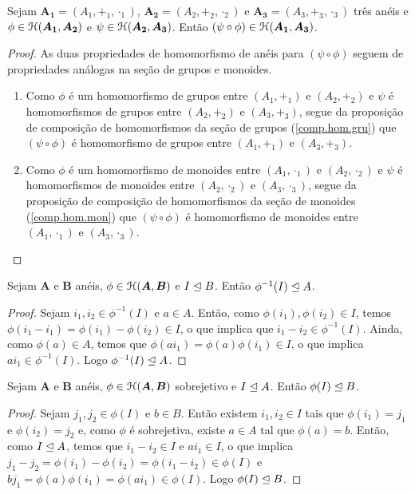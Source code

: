 \begin{corollary}
\label{prop:comp.hom.ane}
	Sejam $\bm{A_1}=(A_1,+_1,\cdot_1)$, $\bm{A_2}=(A_2,+_2,\cdot_2)$ e $\bm{A_3}=(A_3,+_3,\cdot_3)$ três anéis e $\phi \in \mathcal{H}(\bm{A_1},\bm{A_2})$ e $\psi \in \mathcal{H}(\bm{A_2},\bm{A_3})$. Então $(\psi \circ \phi) \in \mathcal{H}(\bm{A_1},\bm{A_3})$.
\end{corollary}
\begin{proof} As duas propriedades de homomorfismo de anéis para $(\psi \circ \phi)$ seguem de propriedades análogas na seção de grupos e monoides.
	\begin{enumerate}
	\item Como $\phi$ é um homomorfismo de grupos entre $(A_1,+_1)$ e $(A_2,+_2)$ e $\psi$ é homomorfismos de grupos entre $(A_2,+_2)$ e $(A_3,+_3)$, segue da proposição de composição de homomorfismos da seção de grupos (\ref{comp.hom.gru}) que $(\psi \circ \phi)$ é homomorfismo de grupos entre $(A_1,+_1)$ e $(A_3,+_3)$.
	\item Como $\phi$ é um homomorfismo de monoides entre $(A_1,\cdot_1)$ e $(A_2,\cdot_2)$ e $\psi$ é homomorfismos de monoides entre $(A_2,\cdot_2)$ e $(A_3,\cdot_3)$, segue da proposição de composição de homomorfismos da seção de monoides (\ref{comp.hom.mon}) que $(\psi \circ \phi)$ é homomorfismo de monoides entre $(A_1,\cdot_1)$ e $(A_3,\cdot_3)$.
	\end{enumerate}
\end{proof}

\begin{proposition}
\label{prop:ide.im.inv}
	Sejam $\bm A$ e $\bm B$ anéis, $\phi \in \mathcal{H}(\bm A,\bm B)$ e $I \mathrel{\unlhd} B$. Então $\phi^{-1}(I) \mathrel{\unlhd} A$.
\end{proposition}
\begin{proof}
	Sejam $i_1,i_2 \in \phi^{-1}(I)$ e $a \in A$. Então, como $\phi(i_1),\phi(i_2) \in I$, temos $\phi(i_1-i_1)=\phi(i_1)-\phi(i_2) \in I$, o que implica que $i_1-i_2 \in \phi^{-1}(I)$. Ainda, como $\phi(a) \in A$, temos que $\phi(ai_1)=\phi(a)\phi(i_1) \in I$, o que implica $ai_1 \in \phi^{-1}(I)$. Logo $\phi^{-1}(I) \mathrel{\unlhd} A$.
\end{proof}

\begin{proposition}
\label{prop:ide.im.ide}
	Sejam $\bm A$ e $\bm B$ anéis, $\phi \in \mathcal{H}(\bm A,\bm B)$ sobrejetivo e $I \mathrel{\unlhd} A$. Então $\phi(I) \mathrel{\unlhd} B$.
\end{proposition}
\begin{proof}
	Sejam $j_1,j_2 \in \phi(I)$ e $b \in B$. Então existem $i_1,i_2 \in I$ tais que $\phi(i_1)=j_1$ e $\phi(i_2)=j_2$ e, como $\phi$ é sobrejetiva, existe $a \in A$ tal que $\phi(a)=b$. Então, como $I \mathrel{\unlhd} A$, temos que $i_1-i_2 \in I$ e $ai_1 \in I$, o que implica $j_1-j_2 = \phi(i_1)-\phi(i_2) =\phi(i_1-i_2) \in \phi(I)$ e $bj_1=\phi(a)\phi(i_1)=\phi(ai_1) \in \phi(I)$. Logo $\phi(I) \mathrel{\unlhd} B$.
\end{proof}

